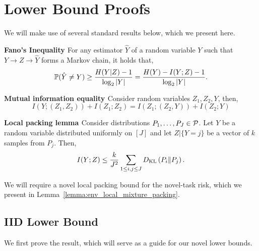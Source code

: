 
\section{Lower Bound Proofs}
\label{app:proofs}

We will make use of several standard results below, which we present here.

\begin{lemma}\textbf{Fano's Inequality \citep{fano1961transmission, cover2012elements} }\label{lemma:fano}
For any estimator $\hat{Y}$ of a random variable $Y$ such that $Y \rightarrow Z \rightarrow \hat{Y}$ forms a Markov chain, it holds that,
\[
\mathbb{P}(\hat{Y} \neq Y) \geq \dfrac{H(Y|Z) - 1}{\log_2 |Y|} = \dfrac{H(Y) - I(Y;Z) - 1}{\log_2 |Y|}.
\]
\end{lemma}

\begin{lemma}\textbf{Mutual information equality \citep{khas1979lower}}\label{lemma:mi_ineq}
Consider random variables $Z_1, Z_2, Y$, then,
\[I(Y; (Z_1,Z_2)) + I(Z_1;Z_2) = I(Z_1; (Z_2, Y)) + I(Z_2; Y)\]
\end{lemma}

\begin{lemma}\textbf{Local packing lemma \citep{loh2017lower}}\label{lemma:local_packing}
Consider distributions $P_1,\ldots,P_J \in \mathcal{P}$. Let $Y$ be a random variable distributed uniformly on $[J]$ and let $Z|\{Y=j\}$ be a vector of $k$ \iid samples from $P_{j}$. Then,
\[
I(Y;Z) \leq \frac{k}{J^2} \sum_{1 \leq i,j \leq J} D_{\mathrm{KL}}\left(P_i\Vert P_j\right).
\]
\end{lemma}
We will require a novel local packing bound for the novel-task risk, which we present in Lemma~\ref{lemma:env_local_mixture_packing}.

\subsection{IID Lower Bound}\label{app:proofs:lbounds}

We first prove the \iid result, which will serve as a guide for our novel lower bounds.

\iidlbound*

